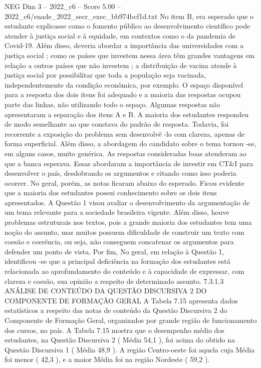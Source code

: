 \begin{textsample}{NEG Dim 3 – 2022\_c6 – Score 5.00 – 2022\_c6/enade\_2022\_secr\_exec\_bb974bcf1d.txt}
No item B, era esperado que o estudante explicasse como o fomento público ao desenvolvimento científico pode atender à justiça social e à equidade, em contextos como o da pandemia de Covid-19.
Além disso, deveria abordar a importância das universidades com a justiça social ; como os países que investem nessa área têm grandes vantagens em relação a outros países que não investem ; a distribuição de vacina atende à justiça social por possibilitar que toda a população seja vacinada, independentemente da condição econômica, por exemplo.
O espaço disponível para a resposta dos dois itens foi adequado e a maioria das respostas ocupou parte das linhas, não utilizando todo o espaço.
Algumas respostas não apresentaram a separação dos itens A e B.
A maioria dos estudantes respondeu de modo semelhante ao que constava do padrão de resposta.
Todavia, foi recorrente a exposição do problema sem desenvolvê -lo com clareza, apenas de forma superficial.
Além disso, a abordagem do candidato sobre o tema tornou -se, em alguns casos, muito genérica.
As respostas consideradas boas atenderam ao que a banca esperava.
Essas abordaram a importância de investir em CT\&I para desenvolver o país, desdobrando os argumentos e citando como isso poderia ocorrer.
No geral, porém, as notas ficaram abaixo do esperado.
Ficou evidente que a maioria dos estudantes possui conhecimento sobre os dois itens apresentados.
A Questão 1 visou avaliar o desenvolvimento da argumentação de um tema relevante para a sociedade brasileira vigente.
Além disso, houve problemas estruturais nos textos, pois a grande maioria dos estudantes tem uma noção do assunto, mas muitos possuem dificuldade de construir um texto com coesão e coerência, ou seja, não conseguem concatenar os argumentos para defender um ponto de vista.
Por fim, No geral, em relação à Questão 1, identificou -se que a principal deficiência na formação dos estudantes está relacionada ao aprofundamento do conteúdo e à capacidade de expressar, com clareza e coesão, sua opinião a respeito de determinado assunto. 7.3.1.3 ANÁLISE DE CONTEÚDO DA QUESTÃO DISCURSIVA 2 DO COMPONENTE DE FORMAÇÃO GERAL A Tabela 7.15 apresenta dados estatísticos a respeito das notas de conteúdo da Questão Discursiva 2 do Componente de Formação Geral, organizados por grande região de funcionamento dos cursos, no país.
A Tabela 7.15 mostra que o desempenho médio dos estudantes, na Questão Discursiva 2 ( Média 54,1 ), foi acima do obtido na Questão Discursiva 1 ( Média 48,9 ).
A região Centro-oeste foi aquela cuja Média foi menor ( 42,3 ), e a maior Média foi na região Nordeste ( 59,2 ).

\end{textsample}
